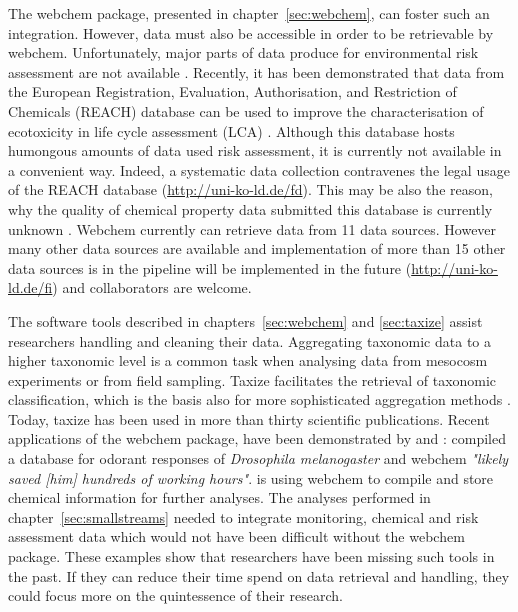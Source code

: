 The webchem package, presented in chapter~\ref{sec:webchem}, can foster such an integration.
However, data must also be accessible in order to be retrievable by webchem. 
Unfortunately, major parts of data produce for environmental risk assessment are not available \citep{schafer_letter_2013, dafforn_big_2015}. 
Recently, it has been demonstrated that data from the European Registration, Evaluation, Authorisation, and Restriction of Chemicals (REACH) database can be used to improve the characterisation of ecotoxicity in life cycle assessment (LCA) \citep{muller_exploring_2016}.
Although this database hosts humongous amounts of data used risk assessment, it is currently not available in a convenient way.
Indeed, a systematic data collection contravenes the legal usage of the REACH database (\url{http://uni-ko-ld.de/fd}).
This may be also the reason, why the quality of chemical property data submitted this database is currently unknown \citep{stieger_assessing_2014, muller_exploring_2016}. 
Webchem currently can retrieve data from 11 data sources. 
However many other data sources are available and implementation of more than 15 other data sources is in the pipeline will be implemented in the future (\url{http://uni-ko-ld.de/fi}) and collaborators are welcome.

The software tools described in chapters~\ref{sec:webchem} and \ref{sec:taxize} assist researchers handling and cleaning their data. 
Aggregating taxonomic data to a higher taxonomic level is a common task when analysing data from mesocosm experiments or from field sampling.
Taxize facilitates the retrieval of taxonomic classification, which is the basis also for more sophisticated aggregation methods \citep{cuffney_ambiguous_2007}. 
Today, taxize has been used in more than thirty scientific publications.
Recent applications of the webchem package, have been demonstrated by \citet{munch_door_2016} and \citet{ranke_jranke/chents_2016}: 
\citet{munch_door_2016} compiled a database for odorant responses of \textit{Drosophila melanogaster} and webchem \emph{"likely saved [him] hundreds of working hours"}. 
\citet{ranke_jranke/chents_2016} is using webchem to compile and store chemical information for further analyses. 
The analyses performed in chapter~\ref{sec:smallstreams} needed to integrate monitoring, chemical and risk assessment data which would not have been difficult without the webchem package. 
These examples show that researchers have been missing such tools in the past.
If they can reduce their time spend on data retrieval and handling, they could focus more on the quintessence of their research. 


